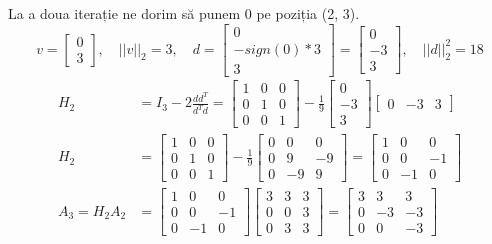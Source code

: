 \documentclass{exam}
\begin{document}
La a doua iterație ne dorim să punem 0 pe poziția (2, 3).
\begin{equation*}
	v = \begin{bmatrix} 0 \\ 3 \end{bmatrix}, \quad ||v||_2 = 3, \quad d = \begin{bmatrix} 0 \\ -sign(0) * 3 \\ 3 \end{bmatrix} = \begin{bmatrix} 0 \\ -3 \\ 3 \end{bmatrix}, \quad ||d||_2^2 = 18
\end{equation*}
\begin{align*}
	H_2           & = I_3 - 2 \frac{d d^T}{d^T d} = \begin{bmatrix} 1 & 0 & 0 \\ 0 & 1 & 0 \\ 0 & 0 & 1 \end{bmatrix} - \frac{1}{9} \begin{bmatrix} 0 \\ -3 \\ 3 \end{bmatrix} \begin{bmatrix} 0 & -3 & 3 \end{bmatrix}                         \\
	H_2           & = \begin{bmatrix} 1 & 0 & 0 \\ 0 & 1 & 0 \\ 0 & 0 & 1 \end{bmatrix} - \frac{1}{9} \begin{bmatrix} 0 & 0 & 0 \\ 0 & 9 & -9 \\ 0 & -9 & 9 \end{bmatrix} = \begin{bmatrix} 1 & 0 & 0 \\ 0 & 0 & -1 \\ 0 & -1 & 0 \end{bmatrix} \\
	A_3 = H_2 A_2 & = \begin{bmatrix} 1 & 0 & 0 \\ 0 & 0 & -1 \\ 0 & -1 & 0 \end{bmatrix} \begin{bmatrix} 3 & 3 & 3 \\ 0 & 0 & 3 \\ 0 & 3 & 3 \end{bmatrix} = \begin{bmatrix} 3 & 3 & 3 \\ 0 & -3 & -3 \\ 0 & 0 & -3 \end{bmatrix}
\end{align*}
\end{document}
